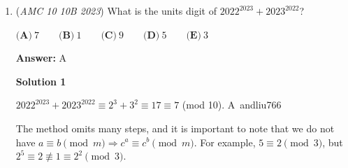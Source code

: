 \begin{enumerate}
 Because \( AM \) is a diagonal of \( \square ABCD \), that means that \( \angle BAC \) is bisected, and \( \angle MAD = 45^\circ \).

 Finally, to find \( \angle EAB \), we are just subtracting \( 80^\circ \) and \( 45^\circ \), giving us \( 80^\circ - 45^\circ = 35^\circ \) or $\boxed{B}$.

 



\textbf{Solution 7 (Overkill complex bash)}

Let the center be the origin of the complex plane. WLOG, let $A = -1 + i$. Then, $E = (-1+i)e^{-\frac{i \pi}{9}} = (-\cos(20^\circ) + \sin(20^\circ)) + i(\sin(20^\circ)+\cos(20^\circ))$. So, $\angle EAB = \arctan(\frac{\sin(20^\circ)+\cos(20^\circ)-1}{-\cos(20^\circ) + \sin(20^\circ)+1})$, because the slope is just the tangent of the angle. Now, we have a bunch of trig bashing.Let $\theta = 20^\circ$. Then we have inside the inverse tangent, $\frac{\sin(\theta)+\cos(\theta)-1}{-\cos(\theta)+\sin(\theta)+1}$. Using $\sin(\theta)=2\cos(\frac{\theta}{2})\sin(\frac{\theta}{2})$, $\cos(\theta)=\cos^2(\frac{\theta}{2})-\sin^2(\frac{\theta}{2})$, and the Pythagorean identity, this ultimately simplifies to $\frac{1-\tan(\frac{\theta}{2})}{1+\tan(\frac{\theta}{2})}$, which can be recognized using the tangent angle subtraction formula as $\tan(45^\circ-\frac{\theta}{2})$, since $\tan(45^\circ)=1$. Therefore, inside of the inverse tangent we have $\tan(35^\circ)$, so the inverse tangent of that is $35^\circ$, or $\boxed{B}$.

 


	\item (\textit{AMC 10 10B 2023}) What is the units digit of $2022^{2023} + 2023^{2022}$?


 $\textbf{(A)}\ 7 \qquad \textbf{(B)}\ 1 \qquad \textbf{(C)}\ 9 \qquad \textbf{(D)}\ 5 \qquad \textbf{(E)}\ 3$

 \textbf{Answer: }A



\textbf{Solution 1}

$2022^{2023} + 2023^{2022} \equiv 2^3 + 3^2 \equiv 17 \equiv 7$ (mod 10). $\boxed{\text{A}}$~andliu766

 The method omits many steps, and it is important to note that we do not have $a\equiv b\pmod{m}\Rightarrow c^{a}\equiv c^{b}\pmod{m}$. For example, $5\equiv 2\pmod{3}$, but $2^{5}\equiv2\not\equiv1\equiv2^{2}\pmod{3}$.

 




\end{enumerate}

